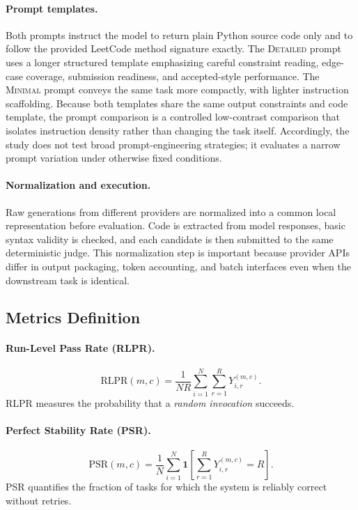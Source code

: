 \documentclass[11pt]{article}
\begin{document}
\paragraph{Prompt templates.} Both prompts instruct the model to return plain Python source code only and to follow the provided LeetCode method signature exactly. The \textsc{Detailed} prompt uses a longer structured template emphasizing careful constraint reading, edge-case coverage, submission readiness, and accepted-style performance. The \textsc{Minimal} prompt conveys the same task more compactly, with lighter instruction scaffolding. Because both templates share the same output constraints and code template, the prompt comparison is a controlled low-contrast comparison that isolates instruction density rather than changing the task itself. Accordingly, the study does not test broad prompt-engineering strategies; it evaluates a narrow prompt variation under otherwise fixed conditions.

\paragraph{Normalization and execution.} Raw generations from different providers are normalized into a common local representation before evaluation. Code is extracted from model responses, basic syntax validity is checked, and each candidate is then submitted to the same deterministic judge. This normalization step is important because provider APIs differ in output packaging, token accounting, and batch interfaces even when the downstream task is identical.

\subsection{Metrics Definition}

\paragraph{Run-Level Pass Rate (RLPR).}
$$
\mathrm{RLPR}(m,c)=\frac{1}{NR}\sum_{i=1}^{N}\sum_{r=1}^{R} Y_{i,r}^{(m,c)}.
$$
RLPR measures the probability that a \emph{random invocation} succeeds.

\paragraph{Perfect Stability Rate (PSR).}
$$
\mathrm{PSR}(m,c)=\frac{1}{N}\sum_{i=1}^{N} \mathbf{1}\!\left[\sum_{r=1}^{R} Y_{i,r}^{(m,c)}=R\right].
$$
PSR quantifies the fraction of tasks for which the system is reliably correct without retries.
\end{document}
